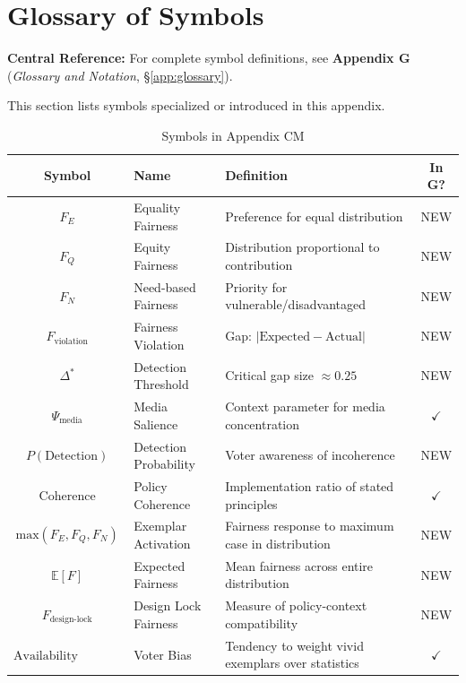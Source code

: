 \section{Glossary of Symbols}
\label{sec:cm-glossary}

\begin{tcolorbox}[colback=blue!5!white, colframe=blue!75!black]
\textbf{Central Reference:} For complete symbol definitions, see
\textbf{Appendix G} (\textit{Glossary and Notation}, \S\ref{app:glossary}).

This section lists symbols specialized or introduced in this appendix.
\end{tcolorbox}

\vspace{0.5em}

\begin{table}[htbp]
\centering
\caption{Symbols in Appendix CM}
\label{tab:cm-symbols}
\renewcommand{\arraystretch}{1.3}
\begin{tabular}{@{}clp{5cm}c@{}}
\toprule
\textbf{Symbol} & \textbf{Name} & \textbf{Definition} & \textbf{In G?} \\
\midrule
$F_E$ & Equality Fairness & Preference for equal distribution & NEW \\
$F_Q$ & Equity Fairness & Distribution proportional to contribution & NEW \\
$F_N$ & Need-based Fairness & Priority for vulnerable/disadvantaged & NEW \\
$F_{\text{violation}}$ & Fairness Violation & Gap: $|\text{Expected} - \text{Actual}|$ & NEW \\
$\Delta^*$ & Detection Threshold & Critical gap size $\approx 0.25$ & NEW \\
$\Psi_{\text{media}}$ & Media Salience & Context parameter for media concentration & $\checkmark$ \\
$P(\text{Detection})$ & Detection Probability & Voter awareness of incoherence & NEW \\
$\text{Coherence}$ & Policy Coherence & Implementation ratio of stated principles & $\checkmark$ \\
$\text{max}(F_E, F_Q, F_N)$ & Exemplar Activation & Fairness response to maximum case in distribution & NEW \\
$\mathbb{E}[F]$ & Expected Fairness & Mean fairness across entire distribution & NEW \\
$F_{\text{design-lock}}$ & Design Lock Fairness & Measure of policy-context compatibility & NEW \\
$\text{Availability Heuristic}$ & Voter Bias & Tendency to weight vivid exemplars over statistics & $\checkmark$ \\
\bottomrule
\end{tabular}
\end{table}

